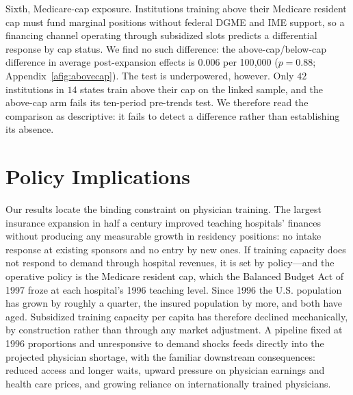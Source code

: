 Sixth, Medicare-cap exposure. Institutions training above their Medicare resident cap must fund marginal positions without federal DGME and IME support, so a financing channel operating through subsidized slots predicts a differential response by cap status. We find no such difference: the above-cap/below-cap difference in average post-expansion effects is $0.006$ per 100{,}000 ($p = 0.88$; Appendix~\cref{afig:abovecap}). The test is underpowered, however. Only $42$ institutions in $14$ states train above their cap on the linked sample, and the above-cap arm fails its ten-period pre-trends test. We therefore read the comparison as descriptive: it fails to detect a difference rather than establishing its absence.

\section{Policy Implications}\label{sec:policy}

Our results locate the binding constraint on physician training. The largest insurance expansion in half a century improved teaching hospitals' finances without producing any measurable growth in residency positions: no intake response at existing sponsors and no entry by new ones. If training capacity does not respond to demand through hospital revenues, it is set by policy---and the operative policy is the Medicare resident cap, which the Balanced Budget Act of 1997 froze at each hospital's 1996 teaching level. Since 1996 the U.S. population has grown by roughly a quarter, the insured population by more, and both have aged. Subsidized training capacity per capita has therefore declined mechanically, by construction rather than through any market adjustment. A pipeline fixed at 1996 proportions and unresponsive to demand shocks feeds directly into the projected physician shortage, with the familiar downstream consequences: reduced access and longer waits, upward pressure on physician earnings and health care prices, and growing reliance on internationally trained physicians.

